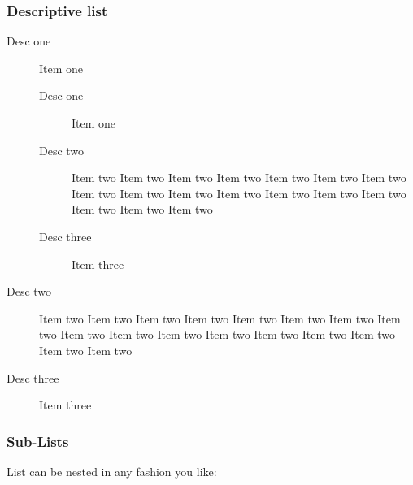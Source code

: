 \documentclass[numbered]{ivt-style/standard}\usepackage[]{graphicx}\usepackage[]{xcolor}
\begin{document}
\subsubsection{Descriptive list}

\begin{description}
  \item[Desc one] Item one
  \begin{description}
    \item[Desc one] Item one
    \item[Desc two] Item two Item two Item two Item two Item two Item
two Item two Item two Item two Item two Item two Item two Item two
Item two Item two Item two Item two
    \item[Desc three] Item three
  \end{description}
  \item[Desc two] Item two Item two Item two Item two Item two Item
two Item two Item two Item two Item two Item two Item two Item two
Item two Item two Item two Item two
  \item[Desc three] Item three
\end{description}

\subsubsection{Sub-Lists}

List can be nested in any fashion you like:
\end{document}
